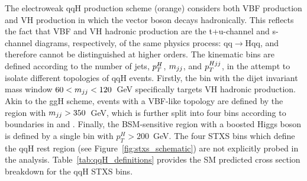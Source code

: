 %     

The electroweak qqH production scheme (orange) considers both VBF production and VH production in which the vector boson decays hadronically. This reflects the fact that VBF and VH hadronic production are the t+u-channel and s-channel diagrams, respectively, of the same physics process: qq$\rightarrow$Hqq, and therefore cannot be distinguished at higher orders. The kinematic bins are defined according to the number of jets, $p_T^H$, $m_{jj}$, and $p_T^{Hjj}$, in the attempt to isolate different topologies of qqH events. Firstly, the bin with the dijet invariant mass window $60<m_{jj}<120$~GeV specifically targets VH hadronic production. Akin to the ggH scheme, events with a VBF-like topology are defined by the region with $m_{jj}>350$~GeV, which is further split into four bins according to boundaries in \mjj and \ptHjj. Finally, the BSM-sensitive region with a boosted Higgs boson is defined by a single bin with $p_T^H>200$~GeV. The four STXS bins which define the qqH rest region (see Figure~\ref{fig:stxs_schematic}) are not explicitly probed in the \Hgg analysis. Table~\ref{tab:qqH_definitions} provides the SM predicted cross section breakdown for the qqH STXS bins.

